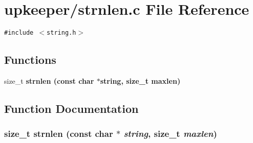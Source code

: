 \section{upkeeper/strnlen.c File Reference}
\label{strnlen_8c}
{\tt \#include $<$string.h$>$}\par
\subsection*{Functions}
\begin{CompactItemize}
\item 
size\_\-t \bf{strnlen} (const char $\ast$string, size\_\-t maxlen)
\end{CompactItemize}


\subsection{Function Documentation}
\subsubsection{\setlength{\rightskip}{0pt plus 5cm}size\_\-t strnlen (const char $\ast$ {\em string}, size\_\-t {\em maxlen})}\label{strnlen_8c_99bf7adbf2b574c4c891d8b183229e39}


